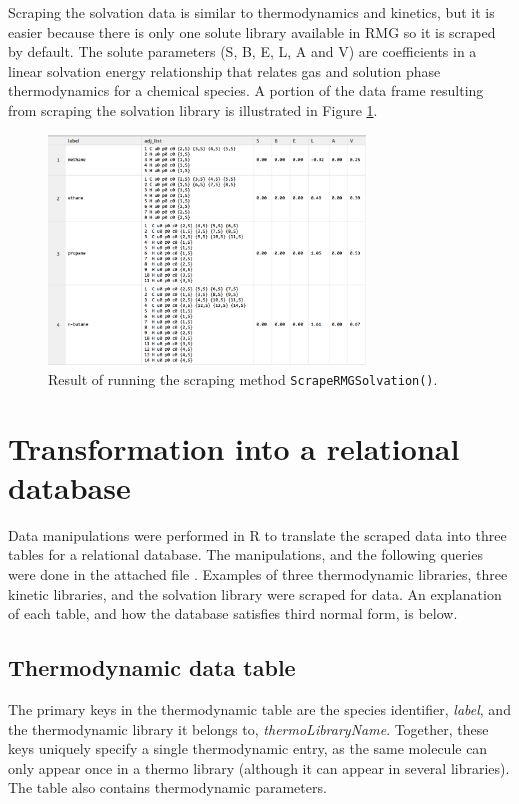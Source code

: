 \documentclass[11pt]{article}
\begin{document}
Scraping the solvation data is similar to thermodynamics and kinetics, but it is easier because there is only one solute library available in RMG so it is scraped by default. The solute parameters (S, B, E, L, A and V) are coefficients in a linear solvation energy relationship that relates gas and solution phase thermodynamics for a chemical species. A portion of the data frame resulting from scraping the solvation library is illustrated in Figure \ref{fig:solvation_df}.

\begin{figure}[h]
\centering
\includegraphics[width=0.75\textwidth]{solvation_df.pdf}
\caption{\label{fig:solvation_df} Result of running the scraping method \texttt{ScrapeRMGSolvation()}.}
\end{figure}

\section{Transformation into a relational database}
Data manipulations were performed in R to translate the scraped data into three tables for a relational database. The manipulations, and the following queries were done in the attached file . Examples of three thermodynamic libraries, three kinetic libraries, and the solvation library were scraped for data. An explanation of each table, and how the database satisfies third normal form, is below. 
\subsection {Thermodynamic data table}
The primary keys in the thermodynamic table are the species identifier, \emph{label}, and the thermodynamic library it belongs to, \emph{thermoLibraryName}. Together, these keys uniquely specify a single thermodynamic entry, as the same molecule can only appear once in a thermo library (although it can appear in several libraries). The table also contains thermodynamic parameters.
\end{document}
